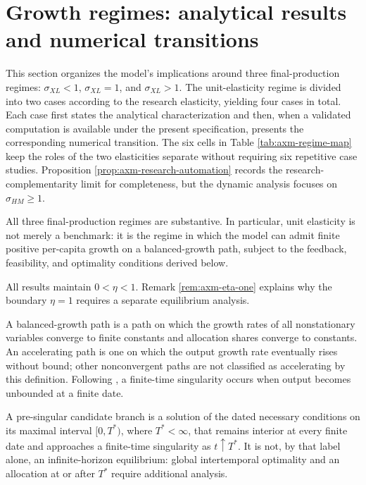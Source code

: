 \section{Growth regimes: analytical results and numerical transitions}
\label{sec:axm-growth-regimes}

This section organizes the model's implications around three final-production
regimes: \(\sigma_{XL}<1\), \(\sigma_{XL}=1\), and \(\sigma_{XL}>1\). The
unit-elasticity regime is divided into two cases according to the research
elasticity, yielding four cases in total. Each case first states the analytical
characterization and then,
when a validated computation is available under the present specification,
presents the corresponding numerical transition. The six cells in Table
\ref{tab:axm-regime-map} keep the roles of the two elasticities separate without
requiring six repetitive case studies. Proposition
\ref{prop:axm-research-automation} records the research-complementarity limit for
completeness, but the dynamic analysis focuses on \(\sigma_{HM}\geq1\).

All three final-production regimes are substantive. In particular, unit
elasticity is not merely a benchmark: it is the regime in which the model can
admit finite positive per-capita growth on a balanced-growth path, subject to
the feedback, feasibility, and optimality conditions derived below.

All results maintain \(0<\eta<1\). Remark \ref{rem:axm-eta-one} explains why
the boundary \(\eta=1\) requires a separate equilibrium analysis.

\begin{definition}
A balanced-growth path is a path on which the growth rates of all nonstationary
variables converge to finite constants and allocation shares converge to
constants. An accelerating path is one on which the output growth rate
eventually rises without bound; other nonconvergent paths are not classified as
accelerating by this definition. Following \citet{aghionjonesjones2019}, a
finite-time singularity occurs when output becomes unbounded at a finite date.
\end{definition}

\begin{definition}
A pre-singular candidate branch is a solution of the dated necessary conditions
on its maximal interval \([0,T^*)\), where \(T^*<\infty\), that remains
interior at every finite date and approaches a finite-time singularity as
\(t\uparrow T^*\). It is not, by that label alone, an infinite-horizon
equilibrium: global intertemporal optimality and an allocation at or after
\(T^*\) require additional analysis.
\end{definition}

